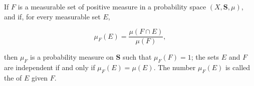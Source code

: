 If $F$ is a measurable set of positive measure in a probability space $(X, \mathbf{S}, \mu)$, and if, for every measurable set $E$,

$$\mu_F(E) = \frac{\mu(F \cap E)}{\mu(F)},$$

then $\mu_F$ is a probability measure on $\mathbf{S}$ such that $\mu_F(F) = 1$; the sets $E$ and $F$ are independent if and only if $\mu_F(E) = \mu(E)$. The number $\mu_F(E)$ is called the  of $E$ given $F$.
